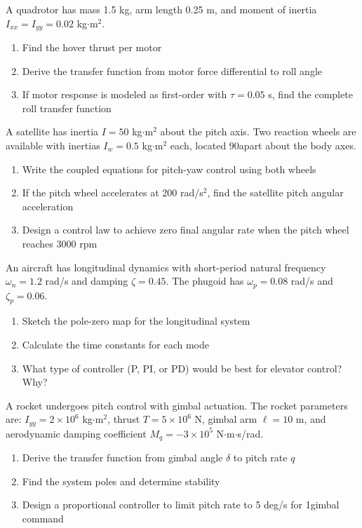 \begin{exercise}
A quadrotor has mass 1.5 kg, arm length 0.25 m, and moment of inertia $I_{xx} = I_{yy} = 0.02$ kg$\cdot$m$^2$.
\begin{enumerate}[label=(\alph*)]
    \item Find the hover thrust per motor
    \item Derive the transfer function from motor force differential to roll angle
    \item If motor response is modeled as first-order with $\tau = 0.05$ s, find the complete roll transfer function
\end{enumerate}
\end{exercise}

\begin{exercise}
A satellite has inertia $I = 50$ kg$\cdot$m$^2$ about the pitch axis. Two reaction wheels are available with inertias $I_w = 0.5$ kg$\cdot$m$^2$ each, located 90\degree apart about the body axes.
\begin{enumerate}[label=(\alph*)]
    \item Write the coupled equations for pitch-yaw control using both wheels
    \item If the pitch wheel accelerates at 200 rad/s$^2$, find the satellite pitch angular acceleration
    \item Design a control law to achieve zero final angular rate when the pitch wheel reaches 3000 rpm
\end{enumerate}
\end{exercise}

\begin{exercise}
An aircraft has longitudinal dynamics with short-period natural frequency $\omega_n = 1.2$ rad/s and damping $\zeta = 0.45$. The phugoid has $\omega_p = 0.08$ rad/s and $\zeta_p = 0.06$.
\begin{enumerate}[label=(\alph*)]
    \item Sketch the pole-zero map for the longitudinal system
    \item Calculate the time constants for each mode
    \item What type of controller (P, PI, or PD) would be best for elevator control? Why?
\end{enumerate}
\end{exercise}

\begin{exercise}
A rocket undergoes pitch control with gimbal actuation. The rocket parameters are: $I_{yy} = 2 \times 10^6$ kg$\cdot$m$^2$, thrust $T = 5 \times 10^6$ N, gimbal arm $\ell = 10$ m, and aerodynamic damping coefficient $M_q = -3 \times 10^5$ N$\cdot$m$\cdot$s/rad.
\begin{enumerate}[label=(\alph*)]
    \item Derive the transfer function from gimbal angle $\delta$ to pitch rate $q$
    \item Find the system poles and determine stability
    \item Design a proportional controller to limit pitch rate to 5 deg/s for 1\degree gimbal command
\end{enumerate}
\end{exercise}

